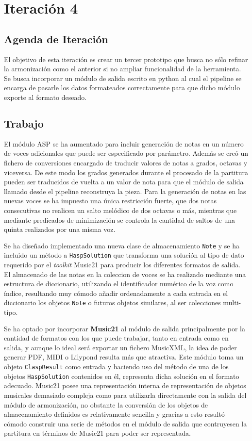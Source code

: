 \section{Iteración 4}

\subsection{Agenda de Iteración}
El objetivo de esta iteración es crear un tercer prototipo que busca no sólo refinar la armonización como el anterior si no ampliar funcionalidad de la herramienta. Se busca incorporar un módulo de salida escrito en python al cual el pipeline se encarga de pasarle los datos formateados correctamente para que dicho módulo exporte al formato deseado. 

\subsection{Trabajo}
El módulo ASP se ha aumentado para incluir generación de notas en un número de voces adicionales que puede ser especificado por parámetro. Además se creó un fichero de conversiones encargado de traducir valores de notas a grados, octavas y viceversa. De este modo los grados generados durante el procesado de la partitura pueden ser traducidos de vuelta a un valor de nota para que el módulo de salida llamado desde el pipeline reconstruya la pieza. Para la generación de notas en las nuevas voces se ha impuesto una única restricción fuerte, que dos notas consecutivas no realicen un salto melódico de dos octavas o más, mientras que mediante predicados de minimización se controla la cantidad de saltos de una quinta realizados por una misma voz.

Se ha diseñado implementado una nueva clase de almacenamiento \texttt{Note} y se ha incluido un método a \texttt{HaspSolution} que transforma una solución al tipo de dato requerido por el \textit{toolkit} Music21 para producir los diferentes formatos de salida. El almacenado de las notas en la coleccion de voces se ha realizado mediante una estructura de diccionario, utilizando el identificador numérico de la voz como índice, resultando muy cómodo añadir ordenadamente a cada entrada en el diccionario los objetos \texttt{Note} o futuros objetos similares, al ser colecciones multi-tipo.

Se ha optado por incorporar \textbf{Music21} al módulo de salida principalmente por la cantidad de formatos con los que puede trabajar, tanto en entrada como en salida, y aunque lo ideal será exportar un fichero MusicXML, la idea de poder generar PDF, MIDI o Lilypond resulta más que atractiva. Este módulo toma un objeto \texttt{ClaspResult} como entrada y haciendo uso del método de una de los objetos \texttt{HaspSolution} contenidos en él, representa dicha solución en el formato adecuado. Music21 posee una representación interna de representación de objetos musicales demasiado compleja como para utilizarla directamente con la salida del módulo de armonización, no obstante la conversión de los objetos de almacenamiento definidos es relativamente sencilla y gracias a esto resultó cómodo construir una serie de métodos en el módulo de salida que contruyesen la partitura en términos de Music21 para poder ser representada. 

